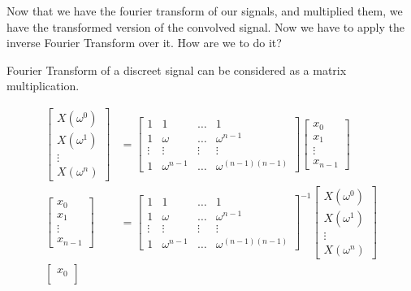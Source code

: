 Now that we have the fourier transform of our signals, and multiplied them, we have the transformed version of the convolved signal. Now we have to apply the inverse Fourier Transform over it. How are we to do it?

Fourier Transform of a discreet signal can be considered as a matrix multiplication.


\begin{align*}
\begin{bmatrix}
    X(\omega^0)\\
    X(\omega^1)\\
    \vdots\\
    X(\omega^n)
\end{bmatrix} 
    &=
\begin{bmatrix}
    1      & 1      & \dots  & 1\\
    1      & \omega & \dots  & \omega^{n-1}\\
    \vdots & \vdots & \vdots & \vdots\\
    1      & \omega^{n-1} & \dots & \omega^{(n-1)(n-1)}
\end{bmatrix}
\begin{bmatrix}
    x_0\\
    x_1\\
    \vdots\\
    x_{n-1}
\end{bmatrix}\\
\begin{bmatrix}
    x_0\\
    x_1\\
    \vdots\\
    x_{n-1}
\end{bmatrix}
    &=
\begin{bmatrix}
    1      & 1      & \dots  & 1\\
    1      & \omega & \dots  & \omega^{n-1}\\
    \vdots & \vdots & \vdots & \vdots\\
    1      & \omega^{n-1} & \dots & \omega^{(n-1)(n-1)}
\end{bmatrix}^{-1}
\begin{bmatrix}
    X(\omega^0)\\
    X(\omega^1)\\
    \vdots\\
    X(\omega^n)
\end{bmatrix}\\
\begin{bmatrix}
    x_0\\

\end{bmatrix}
\end{align*}
